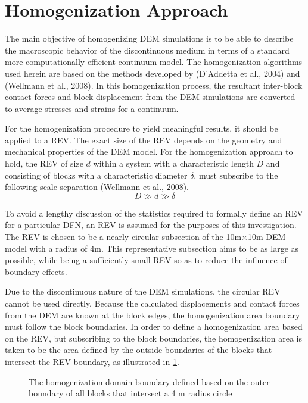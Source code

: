 \section{Homogenization Approach}
The main objective of homogenizing DEM simulations is to be able to describe the macroscopic behavior of the discontinuous medium in terms of a standard more computationally efficient continuum model. The homogenization algorithms used herein are based on the methods developed by (D’Addetta et al., 2004) and (Wellmann et al., 2008). In this homogenization process, the resultant inter-block contact forces and block displacement from the DEM simulations are converted to average stresses and strains for a continuum.

For the homogenization procedure to yield meaningful results, it should be applied to a REV. The exact size of the REV depends on the geometry and mechanical properties of the DEM model. For the homogenization approach to hold, the REV of size $d$ within a system with a characteristic length $D$ and consisting of blocks with a characteristic diameter $\delta$, must subscribe to the following scale separation (Wellmann et al., 2008).
\begin{equation}
\label{eqn:hom1a}
D \gg d \gg \delta
\end{equation}

To avoid a lengthy discussion of the statistics required to formally define an REV for a particular DFN, an REV is assumed for the purposes of this investigation. The REV is chosen to be a nearly circular subsection of the 10m×10m DEM model with a radius of 4m. This representative subsection aims to be as large as possible, while being a sufficiently small REV so as to reduce the influence of boundary effects.

Due to the discontinuous nature of the DEM simulations, the circular REV cannot be used directly. Because the calculated displacements and contact forces from the DEM are known at the block edges, the homogenization area boundary must follow the block boundaries. In order to define a homogenization area based on the REV, but subscribing to the block boundaries, the homogenization area is taken to be the area defined by the outside boundaries of the blocks that intersect the REV boundary, as illustrated in \ref{fig:vorDFN}. 
\begin{figure}
	\label{fig:vorDFN}
	\caption{The homogenization domain boundary defined based on the outer boundary of all blocks that intersect a 4 m radius circle}
\end{figure}

